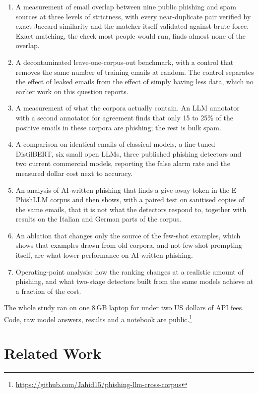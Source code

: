 \begin{enumerate}
\item A measurement of email overlap between nine public phishing and spam
sources at three levels of strictness, with every near-duplicate pair verified
by exact Jaccard similarity and the matcher itself validated against brute
force. Exact matching, the check most people would run, finds almost none of
the overlap.
\item A decontaminated leave-one-corpus-out benchmark, with a control that
removes the same number of training emails at random. The control separates
the effect of leaked emails from the effect of simply having less data, which
no earlier work on this question reports.
\item A measurement of what the corpora actually contain. An LLM annotator with
a second annotator for agreement finds that only 15 to 25\% of the positive
emails in these corpora are phishing; the rest is bulk spam.
\item A comparison on identical emails of classical models, a fine-tuned
DistilBERT, six small open LLMs, three published phishing detectors and two
current commercial models, reporting the false alarm rate and the measured
dollar cost next to accuracy.
\item An analysis of AI-written phishing that finds a give-away token in the
E-PhishLLM corpus and then shows, with a paired test on sanitised copies of the
same emails, that it is not what the detectors respond to, together with
results on the Italian and German parts of the corpus.
\item An ablation that changes only the source of the few-shot examples, which
shows that examples drawn from old corpora, and not few-shot prompting itself,
are what lower performance on AI-written phishing.
\item Operating-point analysis: how the ranking changes at a realistic amount
of phishing, and what two-stage detectors built from the same models achieve
at a fraction of the cost.
\end{enumerate}

The whole study ran on one 8\,GB laptop for under two US dollars of API fees.
Code, raw model answers, results and a notebook are public.\footnote{\url{https://github.com/Jahid15/phishing-llm-cross-corpus}}

\section{Related Work}


